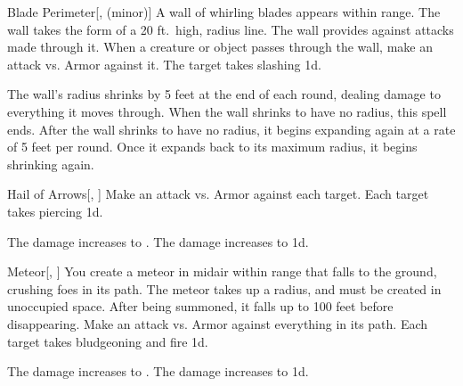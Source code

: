 \lowercase{\hypertarget{spell:Blade Perimeter}{}}\label{spell:Blade Perimeter}
\begin{freeability}[Rank 4]{\hypertarget{spell:Blade Perimeter}{Blade Perimeter}}[,  (minor)]
A wall of whirling blades appears within \rngmed range.
The wall takes the form of a 20 ft.\ high, \areamed radius line.
The wall provides  against attacks made through it.
When a creature or object passes through the wall, make an attack vs. Armor against it.
\hit The target takes slashing  \minus1d.

\rankline
{} The wall's radius shrinks by 5 feet at the end of each round, dealing damage to everything it moves through.
When the wall shrinks to have no radius, this spell ends.
 After the wall shrinks to have no radius, it begins expanding again at a rate of 5 feet per round.
Once it expands back to its maximum radius, it begins shrinking again.
\end{freeability}
\vspace{0.25em}



\lowercase{\hypertarget{spell:Hail of Arrows}{}}\label{spell:Hail of Arrows}
\begin{freeability}[Rank 4]{\hypertarget{spell:Hail of Arrows}{Hail of Arrows}}[, ]
Make an attack vs. Armor against each target.
\hit Each target takes piercing  \minus1d.

\rankline
{} The damage increases to .
 The damage increases to  \plus1d.
\end{freeability}
\vspace{0.25em}



\lowercase{\hypertarget{spell:Meteor}{}}\label{spell:Meteor}
\begin{freeability}[Rank 4]{\hypertarget{spell:Meteor}{Meteor}}[, ]
You create a meteor in midair within \rngclose range that falls to the ground, crushing foes in its path.
The meteor takes up a \areasmall radius, and must be created in unoccupied space.
After being summoned, it falls up to 100 feet before disappearing.
Make an attack vs. Armor against everything in its path.
\hit Each target takes bludgeoning and fire  \minus1d.

\rankline
{} The damage increases to .
 The damage increases to  \plus1d.
\end{freeability}
\vspace{0.25em}



